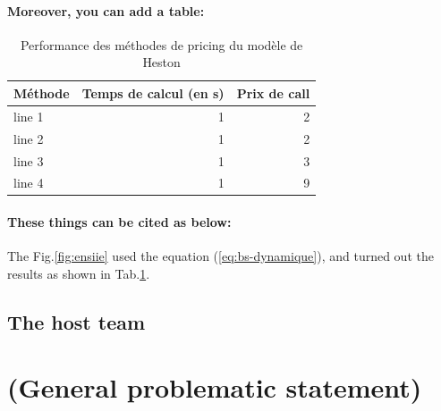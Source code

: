 \paragraph{Moreover, you can add a table: }
\begin{table}[H]
    \centering
    \begin{tabular}{lrr}
    \hline
        Méthode & Temps de calcul (en s) & Prix de call \\
    \hline
        line 1 & 1 & 2 \\
        line 2 & 1 & 2 \\
        line 3 & 1 & 3 \\
        line 4 & 1 & 9 \\
    \hline
    \end{tabular}
    \caption{Performance des méthodes de pricing du modèle de Heston}
    \label{tab:heston_methods} %
\end{table}

\paragraph{These things can be cited as below: }

The Fig.\ref{fig:ensiie} used the equation (\ref{eq:bs-dynamique}), and turned out the results as shown in Tab.\ref{tab:heston_methods}.




\subsection{The host team}
















\newpage
\section{(General problematic statement)}

